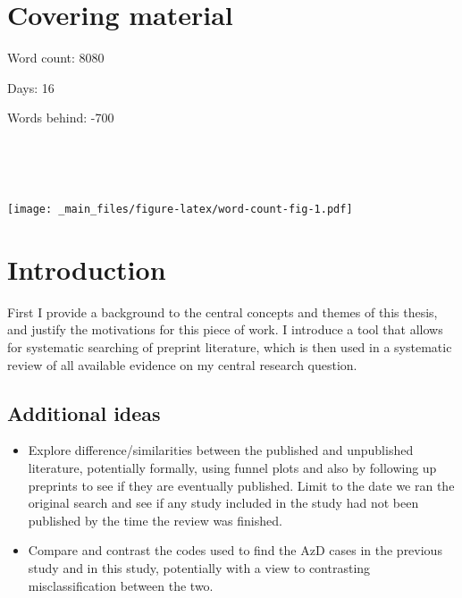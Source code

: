 \documentclass[a4paper, twoside]{templates/ociamthesis}
\providecommand{\tightlist}{%
  \setlength{\itemsep}{0pt}\setlength{\parskip}{0pt}}
\begin{document}
\flushbottom

\hypertarget{covering-material}{%
\chapter*{Covering material}\label{covering-material}}

\adjustmtc

Word count: 8080

Days: 16

Words behind: -700

~

~

\texttt{[image: \_main\_files/figure-latex/word-count-fig-1.pdf]}

\hypertarget{intro-heading}{%
\chapter{Introduction}\label{intro-heading}}

\minitoc 

First I provide a background to the central concepts and themes of this thesis, and justify the motivations for this piece of work. I introduce a tool that allows for systematic searching of preprint literature, which is then used in a systematic review of all available evidence on my central research question.

\hypertarget{additional-ideas}{%
\section{Additional ideas}\label{additional-ideas}}

\begin{itemize}
\tightlist
\item
  Explore difference/similarities between the published and unpublished literature, potentially formally, using funnel plots and also by following up preprints to see if they are eventually published. Limit to the date we ran the original search and see if any study included in the study had not been published by the time the review was finished.
\item
  Compare and contrast the codes used to find the AzD cases in the previous study and in this study, potentially with a view to contrasting misclassification between the two.
\end{itemize}
\end{document}
